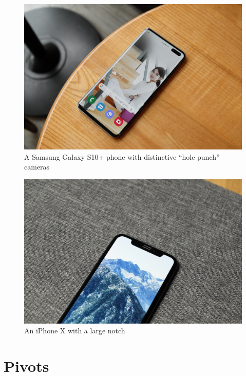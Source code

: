 \documentclass[a4paper, 10pt, american, titlepage]{article}
\begin{document}
\begin{figure}[h]
	\centering
	\includegraphics[width=\textwidth]{galaxy-s10+.jpg}
	\caption[A Samsung Galaxy S10+ phone with distinctive ``hole punch''
	cameras]{A Samsung Galaxy S10+ phone with distinctive ``hole punch''
		cameras~\autocite{yoo2019}}
	\label{fig:galaxyS10Plus}
\end{figure}

\begin{figure}[h]
	\centering
	\includegraphics[width=\textwidth]{iphone-x.jpg}
	\caption[An iPhone X with a large notch]{An iPhone X with a large
		notch~\autocite{yoo2017}}
	\label{fig:iPhoneX}
\end{figure}

\clearpage

\section{Pivots}
\label{sec:pivots}
\end{document}
